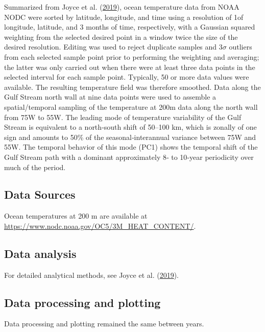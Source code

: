 \documentclass[
]{book}
\begin{document}
Summarized from Joyce et al. (\protect\hyperlink{ref-joyce2019}{2019}), ocean temperature data from NOAA NODC were sorted by latitude, longitude, and time using a resolution of 1\textdegree of longitude, latitude, and 3 months of time, respectively, with a Gaussian squared weighting from the selected desired point in a window twice the size of the desired resolution. Editing was used to reject duplicate samples and 3\(\sigma\) outliers from each selected sample point prior to performing the weighting and averaging; the latter was only carried out when there were at least three data points in the selected interval for each sample point. Typically, 50 or more data values were available. The resulting temperature field was therefore smoothed. Data along the Gulf Stream north wall at nine data points were used to assemble a spatial/temporal sampling of the temperature at 200m data along the north wall from 75\textdegree W to 55\textdegree W. The leading mode of temperature variability of the Gulf Stream is equivalent to a north‐south shift of 50--100 km, which is zonally of one sign and amounts to 50\% of the seasonal‐interannual variance between 75\textdegree W and 55\textdegree W. The temporal behavior of this mode (PC1) shows the temporal shift of the Gulf Stream path with a dominant approximately 8‐ to 10‐year periodicity over much of the period.

\hypertarget{data-sources-17}{%
\subsection{Data Sources}\label{data-sources-17}}

Ocean temperatures at 200 m are available at \url{https://www.nodc.noaa.gov/OC5/3M_HEAT_CONTENT/}.

\hypertarget{data-analysis-16}{%
\subsection{Data analysis}\label{data-analysis-16}}

For detailed analytical methods, see Joyce et al. (\protect\hyperlink{ref-joyce2019}{2019}).

\hypertarget{data-processing-and-plotting}{%
\subsection{Data processing and plotting}\label{data-processing-and-plotting}}

Data processing and plotting remained the same between years.
\end{document}
